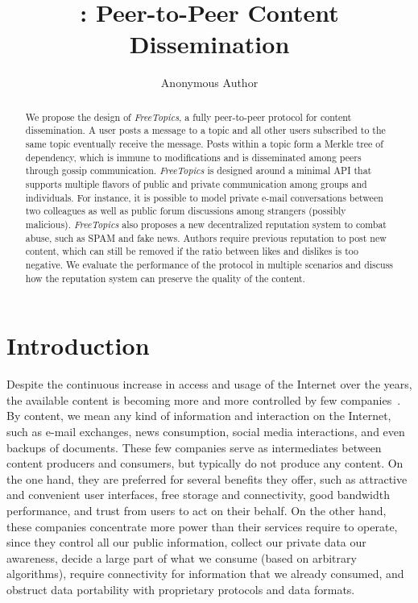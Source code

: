 \documentclass[12pt]{article}
\title{\FC: Peer-to-Peer Content Dissemination}
\author{Anonymous Author\inst{1}}
\newcommand{\FC} {\emph{FreeTopics}\xspace}
\begin{document}
 

\maketitle

\begin{abstract}
We propose the design of \FC, a fully peer-to-peer protocol for content
dissemination.
%
A user posts a message to a topic and all other users subscribed to the same
topic eventually receive the message.
Posts within a topic form a Merkle tree of dependency, which is immune to
modifications and is disseminated among peers through gossip communication.
%
\FC is designed around a minimal API that supports multiple flavors of public
and private communication among groups and individuals.
For instance, it is possible to model private e-mail conversations between two
colleagues as well as public forum discussions among strangers (possibly
malicious).
%
\FC also proposes a new decentralized reputation system to combat abuse, such
as SPAM and fake news.
Authors require previous reputation to post new content, which can still be
removed if the ratio between likes and dislikes is too negative.
%
We evaluate the performance of the protocol in multiple scenarios and discuss
how the reputation system can preserve the quality of the content.
\end{abstract}
     

\section{Introduction}

Despite the continuous increase in access and usage of the Internet over the
years, the available content is becoming more and more controlled by few
companies~\cite{internet.fixing}.
By content, we mean any kind of information and interaction on the Internet,
such as e-mail exchanges, news consumption, social media interactions, and even
backups of documents.
These few companies serve as intermediates between content producers and
consumers, but typically do not produce any content.
On the one hand, they are preferred for several benefits they offer, such as
    attractive and convenient user interfaces,
    free storage and connectivity,
    good bandwidth performance, and
    trust from users to act on their behalf.
On the other hand, these companies concentrate more power than their services
require to operate, since they
    control all our public information,
    collect our private data our awareness,
    decide a large part of what we consume (based on arbitrary algorithms),
    require connectivity for information that we already consumed, and
    obstruct data portability with proprietary protocols and data formats.
\end{document}
